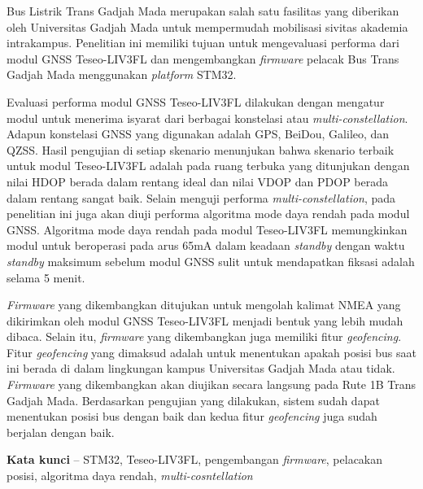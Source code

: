 Bus Listrik Trans Gadjah Mada merupakan salah satu fasilitas yang diberikan oleh Universitas Gadjah Mada untuk mempermudah mobilisasi sivitas akademia intrakampus. Penelitian ini memiliki tujuan untuk mengevaluasi performa dari modul GNSS Teseo-LIV3FL dan mengembangkan \textit{firmware} pelacak Bus Trans Gadjah Mada menggunakan \textit{platform} STM32.

Evaluasi performa modul GNSS Teseo-LIV3FL dilakukan dengan mengatur modul untuk menerima isyarat dari berbagai konstelasi atau \textit{multi-constellation}. Adapun konstelasi GNSS yang digunakan adalah GPS, BeiDou, Galileo, dan QZSS. Hasil pengujian di setiap skenario menunjukan bahwa skenario terbaik untuk modul Teseo-LIV3FL adalah pada ruang terbuka yang ditunjukan dengan nilai HDOP berada dalam rentang ideal dan nilai VDOP dan PDOP berada dalam rentang sangat baik. Selain menguji performa \textit{multi-constellation}, pada penelitian ini juga akan diuji performa algoritma mode daya rendah pada modul GNSS. Algoritma mode daya rendah pada modul Teseo-LIV3FL memungkinkan modul untuk beroperasi pada arus 65mA dalam keadaan \textit{standby} dengan waktu \textit{standby} maksimum sebelum modul GNSS sulit untuk mendapatkan fiksasi adalah selama 5 menit.

\textit{Firmware} yang dikembangkan ditujukan untuk mengolah kalimat NMEA yang dikirimkan oleh modul GNSS Teseo-LIV3FL menjadi bentuk yang lebih mudah dibaca. Selain itu, \textit{firmware} yang dikembangkan juga memiliki fitur \textit{geofencing}. Fitur \textit{geofencing} yang dimaksud adalah untuk menentukan apakah posisi bus saat ini berada di dalam lingkungan kampus Universitas Gadjah Mada atau tidak. \textit{Firmware} yang dikembangkan akan diujikan secara langsung pada Rute 1B Trans Gadjah Mada. Berdasarkan pengujian yang dilakukan, sistem sudah dapat menentukan posisi bus dengan baik dan kedua fitur \textit{geofencing} juga sudah berjalan dengan baik.

\noindent\textbf{Kata kunci} -- STM32, Teseo-LIV3FL, pengembangan \textit{firmware}, pelacakan posisi, algoritma daya rendah, \textit{multi-cosntellation}